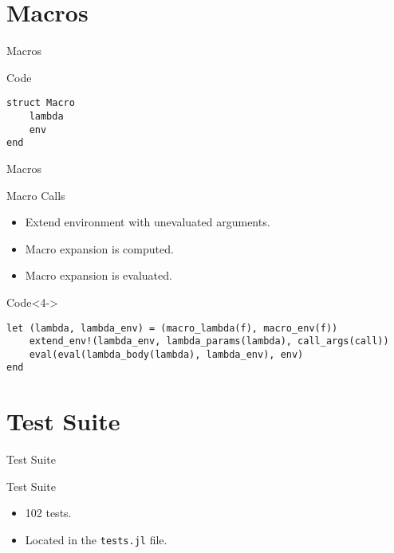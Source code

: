 \documentclass[aspectratio=169]{beamer}
\begin{document}
\section{Macros}
\begin{frame}[fragile]{Macros}
    \begin{exampleblock}{Code}
        \footnotesize \begin{verbatim}
struct Macro
    lambda
    env
end\end{verbatim}
    \end{exampleblock}
\end{frame}

\begin{frame}[fragile]{Macros}
    \begin{block}{Macro Calls}
        \begin{itemize}
            \item<1-> Extend environment with unevaluated arguments.
            \item<2-> Macro expansion is computed.
            \item<3-> Macro expansion is evaluated.
        \end{itemize}
    \end{block}
    \begin{exampleblock}{Code}<4->
        \footnotesize \begin{verbatim}
let (lambda, lambda_env) = (macro_lambda(f), macro_env(f))
    extend_env!(lambda_env, lambda_params(lambda), call_args(call))
    eval(eval(lambda_body(lambda), lambda_env), env)
end\end{verbatim}
    \end{exampleblock}
\end{frame}

\section{Test Suite}
\begin{frame}[fragile]{Test Suite}
    \begin{block}{Test Suite}
        \begin{itemize}
            \item<1-> 102 tests.
            \item<2-> Located in the \texttt{tests.jl} file.
        \end{itemize}
    \end{block}
\end{frame}
\end{document}
